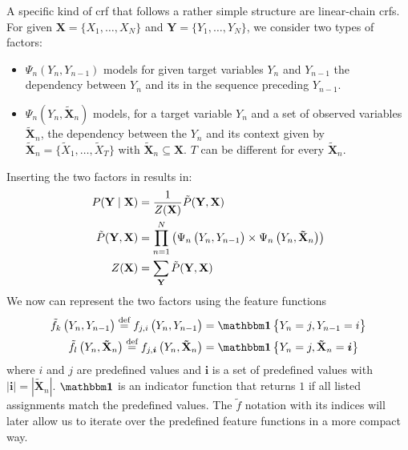 A specific kind of \gls{crf} that follows a rather simple structure are \glspl{linear-chain crf}.
For given $\mathbf{X}=\{X_1,\dots,X_N\}$ and $\mathbf{Y}=\{Y_1,\dots,Y_N\}$, we consider two types of \glspl{factor}:
\begin{itemize}
  \item $\Psi_n(Y_n,Y_{n-1})$ models for given \glspl{target variable} $Y_n$ and $Y_{n-1}$ the dependency between $Y_n$ and its in the sequence preceding $Y_{n-1}$.
  \item $\Psi_n(Y_n,\mathbf{\tilde{X}}_n)$ models, for a \gls{target variable} $Y_n$ and a set of \glspl{observed variable} $\mathbf{\tilde{X}}_n$, the dependency between the $Y_n$ and its context given by $\mathbf{\tilde{X}}_n=\{\tilde{X}_1,\dots,\tilde{X}_T\}$ with $\mathbf{\tilde{X}}_n\subseteq\mathbf{X}$.
    $T$ can be different for every $\mathbf{\tilde{X}}_n$.
\end{itemize}
Inserting the two factors in  results in:
\begin{equation}
  \label{equ:linear-chain-crf-factor}
  \begin{split}
    P(\mathbf{Y}\mid\mathbf{X}) & = \frac{1}{Z(\mathbf{X})}\tilde{P}(\mathbf{Y},\mathbf{X}) \\
    \tilde{P}(\mathbf{Y},\mathbf{X}) &= \prod_{n=1}^{N}\left(\Psi_n\left(\vphantom{\tilde{X}}Y_n,Y_{n-1}\right)\times\Psi_n\left(Y_n,\mathbf{\tilde{X}}_n\right)\right) \\
    Z(\mathbf{X}) & = \sum_{\mathbf{Y}}\tilde{P}(\mathbf{Y},\mathbf{X})
  \end{split}
\end{equation}
We now can represent the two \glspl{factor} using the \glspl{feature function}
\begin{equation}
  \label{equ:linear-chain-crf-feature-functions}
  \begin{split}
    \tilde{f}_k\left(\vphantom{\tilde{X}}Y_n,Y_{n-1}\right)\equalsdef f_{j,i}\left(\vphantom{\tilde{X}}Y_n,Y_{n-1}\right) & = \identityfun\left\{\vphantom{\tilde{X}}Y_n=j,Y_{n-1}=i\right\}\\
    \tilde{f}_l\left(Y_n,\mathbf{\tilde{X}}_n\right)\equalsdef f_{j,\bm{i}}\left( Y_n,\mathbf{\tilde{X}}_n\right) & = \identityfun\left\{Y_n=j,\mathbf{\tilde{X}}_n=\bm{i}\right\}
  \end{split}
\end{equation}
where $i$ and $j$ are predefined values and $\bm{i}$ is a set of predefined values with $|\bm{i}|=|\mathbf{\tilde{X}}_n|$. $\identityfun$ is an indicator function that returns $1$ if all listed assignments match the predefined values.
The $\tilde{f}$ notation with its indices will later allow us to iterate over the predefined \glspl{feature function} in a more compact way.

